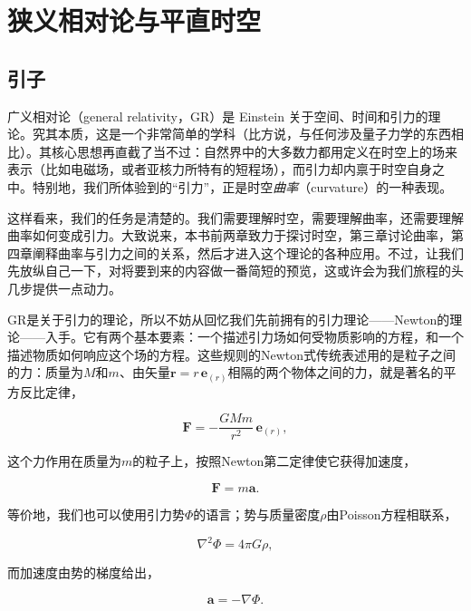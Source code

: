\chapter{狭义相对论与平直时空}

\section{引子}

广义相对论（general relativity，GR）是 Einstein 关于空间、时间和引力的理论。究其本质，这是一个非常简单的学科（比方说，与任何涉及量子力学的东西相比）。其核心思想再直截了当不过：自然界中的大多数力都用定义在时空上的场来表示（比如电磁场，或者亚核力所特有的短程场），而引力却内禀于时空自身之中。特别地，我们所体验到的“引力”，正是时空\emph{曲率}（curvature）的一种表现。

这样看来，我们的任务是清楚的。我们需要理解时空，需要理解曲率，还需要理解曲率如何变成引力。大致说来，本书前两章致力于探讨时空，第三章讨论曲率，第四章阐释曲率与引力之间的关系，然后才进入这个理论的各种应用。不过，让我们先放纵自己一下，对将要到来的内容做一番简短的预览，这或许会为我们旅程的头几步提供一点动力。

GR是关于引力的理论，所以不妨从回忆我们先前拥有的引力理论——Newton的理论——入手。它有两个基本要素：一个描述引力场如何受物质影响的方程，和一个描述物质如何响应这个场的方程。这些规则的Newton式传统表述用的是粒子之间的力：质量为$M$和$m$、由矢量$\mathbf{r}=r\,\mathbf{e}_{(r)}$相隔的两个物体之间的力，就是著名的平方反比定律，

\begin{equation*}
\mathbf{F} = -\frac{GMm}{r^2}\,\mathbf{e}_{(r)},
\tag{1.1}
\end{equation*}

这个力作用在质量为$m$的粒子上，按照Newton第二定律使它获得加速度，

\begin{equation*}
\mathbf{F} = m\mathbf{a}.
\tag{1.2}
\end{equation*}

等价地，我们也可以使用引力势$\Phi$的语言；势与质量密度$\rho$由Poisson方程相联系，

\begin{equation*}
\nabla^2\Phi = 4\pi G\rho,
\tag{1.3}
\end{equation*}

而加速度由势的梯度给出，

\begin{equation*}
\mathbf{a} = -\nabla\Phi.
\tag{1.4}
\end{equation*}

